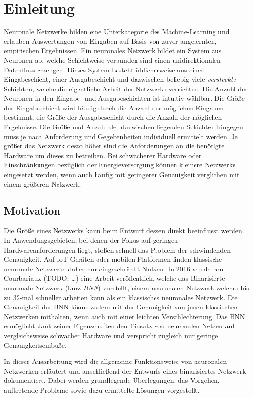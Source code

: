 \chapter{Einleitung}

Neuronale Netzwerke bilden eine Unterkategorie des Machine-Learning und erlauben
Auswertungen von Eingaben auf Basis von zuvor angelernten, empirischen
Ergebnissen.
Ein neuronales Netzwerk bildet ein System aus Neuronen ab, welche Schichtweise
verbunden sind einen unidirektionalen Datenfluss erzeugen.
Dieses System besteht üblicherweise aus einer Eingabeschicht, einer
Ausgabeschicht und dazwischen beliebig viele \emph{versteckte} Schichten,
welche die eigentliche Arbeit des Netzwerks verrichten.
Die Anzahl der Neuronen in den Eingabe- und Ausgabeschichten ist intuitiv
wählbar. Die Größe der Eingabeschicht wird häufig durch die Anzahl der
möglichen Eingaben bestimmt, die Größe der Ausgabeschicht durch die Anzahl
der möglichen Ergebnisse.
Die Größe und Anzahl der dazwischen liegenden Schichten hingegen muss je
nach Anforderung und Gegebenheiten individuell ermittelt werden.
Je größer das Netzwerk desto höher sind die Anforderungen an die benötigte
Hardware um dieses zu betreiben. Bei schwächerer Hardware oder
Einschränkungen bezüglich der Energieversorgung können kleinere Netzwerke
eingesetzt werden, wenn auch häufig mit geringerer Genauigkeit verglichen
mit einem größeren Netzwerk.


\section{Motivation}

Die Größe eines Netzwerks kann beim Entwurf dessen direkt beeinflusst werden.
In Anwendungsgebieten, bei denen der Fokus auf geringen Hardwareanforderungen
liegt, stoßen schnell das Problem der schwindenden Genauigkeit.
Auf IoT-Geräten oder mobilen Platformen finden klassische neuronale Netzwerke
daher nur eingeschränkt Nutzen.
In 2016 wurde von Courbariaux (TODO: \dots) eine Arbeit veröffentlich,
welche das Binarisierte neuronale Netzwerk (kurz \emph{BNN}) vorstellt,
einem neuronalen Netzwerk welches bis zu 32-mal schneller arbeiten kann
als ein klassisches neuronales Netzwerk.
Die Genauigkeit des BNN könne zudem mit der Genauigkeit von jenen klassischen
Netzwerken mithalten, wenn auch mit einer leichten Verschlechterung.
Das BNN ermöglicht dank seiner Eigenschaften den Einsatz von
neuronalen Netzen auf vergleichsweise schwacher Hardware und verspricht zugleich
nur geringe Genauigkeitseinbüße.

In dieser Ausarbeitung wird die allgemeine Funktionsweise von neuronalen
Netzwerken erläutert und anschließend der Entwurfs eines binarisiertes
Netzwerk dokumentiert.
Dabei werden grundlegende Überlegungen, das Vorgehen, auftretende Probleme
sowie dazu ermittelte Lösungen vorgestellt.